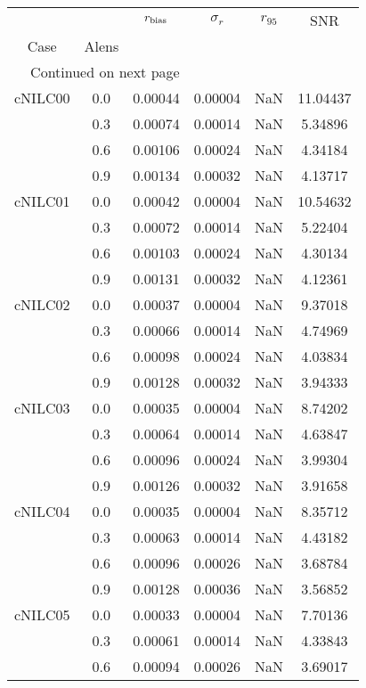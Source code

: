 \begin{longtable}{cccccc}
\toprule
        &     &  $r_{\rm bias}$  &  $\sigma_r$ &  $r_{95}$ &      SNR \\
Case & Alens &                  &             &           &          \\
\midrule
\endhead
\midrule
\multicolumn{3}{r}{{Continued on next page}} \\
\midrule
\endfoot

\bottomrule
\endlastfoot
cNILC00 & 0.0 & 0.00044 & 0.00004 & NaN & 11.04437 \\
        & 0.3 & 0.00074 & 0.00014 & NaN & 5.34896 \\
        & 0.6 & 0.00106 & 0.00024 & NaN & 4.34184 \\
        & 0.9 & 0.00134 & 0.00032 & NaN & 4.13717 \\
cNILC01 & 0.0 & 0.00042 & 0.00004 & NaN & 10.54632 \\
        & 0.3 & 0.00072 & 0.00014 & NaN & 5.22404 \\
        & 0.6 & 0.00103 & 0.00024 & NaN & 4.30134 \\
        & 0.9 & 0.00131 & 0.00032 & NaN & 4.12361 \\
cNILC02 & 0.0 & 0.00037 & 0.00004 & NaN & 9.37018 \\
        & 0.3 & 0.00066 & 0.00014 & NaN & 4.74969 \\
        & 0.6 & 0.00098 & 0.00024 & NaN & 4.03834 \\
        & 0.9 & 0.00128 & 0.00032 & NaN & 3.94333 \\
cNILC03 & 0.0 & 0.00035 & 0.00004 & NaN & 8.74202 \\
        & 0.3 & 0.00064 & 0.00014 & NaN & 4.63847 \\
        & 0.6 & 0.00096 & 0.00024 & NaN & 3.99304 \\
        & 0.9 & 0.00126 & 0.00032 & NaN & 3.91658 \\
cNILC04 & 0.0 & 0.00035 & 0.00004 & NaN & 8.35712 \\
        & 0.3 & 0.00063 & 0.00014 & NaN & 4.43182 \\
        & 0.6 & 0.00096 & 0.00026 & NaN & 3.68784 \\
        & 0.9 & 0.00128 & 0.00036 & NaN & 3.56852 \\
cNILC05 & 0.0 & 0.00033 & 0.00004 & NaN & 7.70136 \\
        & 0.3 & 0.00061 & 0.00014 & NaN & 4.33843 \\
        & 0.6 & 0.00094 & 0.00026 & NaN & 3.69017 \\

\end{longtable}
